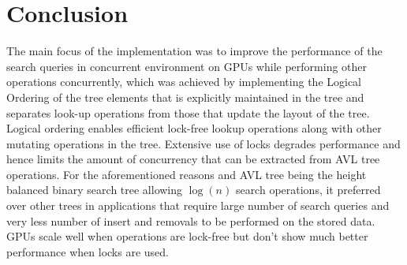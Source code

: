 \documentclass[MTech]{iitmdiss}
\begin{document}
\chapter{Conclusion}
\label{chap:conclusion}
The main focus of the implementation was to improve the performance of the search queries in concurrent environment on GPUs while performing other operations concurrently, which was achieved by implementing the Logical Ordering of the tree elements that is explicitly maintained in the tree and separates look-up operations from those that update the layout of the tree. Logical ordering enables efficient lock-free lookup operations along with other mutating operations in the tree. Extensive use of locks degrades performance and hence limits the amount of concurrency that can be extracted from AVL tree operations. For the aforementioned reasons and AVL tree being the height balanced binary search tree allowing $\log(n)$ search operations, it preferred over other trees in applications that require large number of search queries and very less number of insert and removals to be performed on the stored data. GPUs scale well when operations are lock-free but don't show much better performance when locks are used.   
\end{document}
